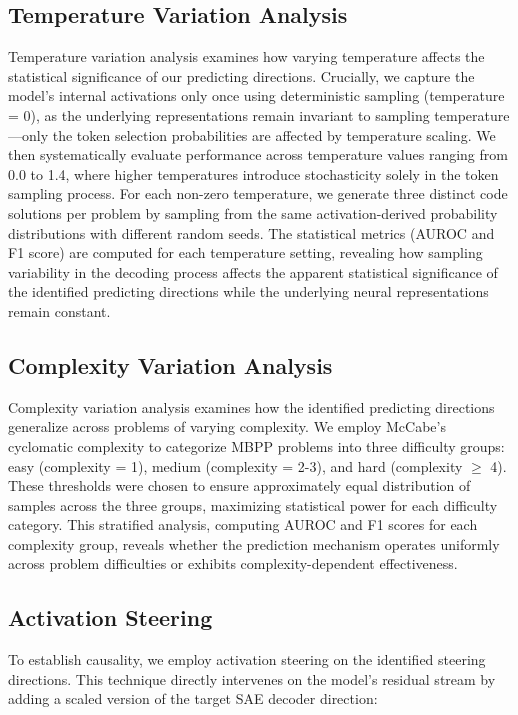 \subsection{Temperature Variation Analysis}

Temperature variation analysis examines how varying temperature affects the statistical significance of our predicting directions. Crucially, we capture the model's internal activations only once using deterministic sampling (temperature = 0), as the underlying representations remain invariant to sampling temperature—only the token selection probabilities are affected by temperature scaling. We then systematically evaluate performance across temperature values ranging from 0.0 to 1.4, where higher temperatures introduce stochasticity solely in the token sampling process. For each non-zero temperature, we generate three distinct code solutions per problem by sampling from the same activation-derived probability distributions with different random seeds. The statistical metrics (AUROC and F1 score) are computed for each temperature setting, revealing how sampling variability in the decoding process affects the apparent statistical significance of the identified predicting directions while the underlying neural representations remain constant.

\subsection{Complexity Variation Analysis}

Complexity variation analysis examines how the identified predicting directions generalize across problems of varying complexity. We employ McCabe's cyclomatic complexity \cite{mccabe1976complexity} to categorize MBPP problems into three difficulty groups: easy (complexity = 1), medium (complexity = 2-3), and hard (complexity $\geq$ 4). These thresholds were chosen to ensure approximately equal distribution of samples across the three groups, maximizing statistical power for each difficulty category. This stratified analysis, computing AUROC and F1 scores for each complexity group, reveals whether the prediction mechanism operates uniformly across problem difficulties or exhibits complexity-dependent effectiveness.

\subsection{Activation Steering}
\label{sec:activation-steering}
To establish causality, we employ activation steering on the identified steering directions. This technique directly intervenes on the model's residual stream by adding a scaled version of the target SAE decoder direction:

